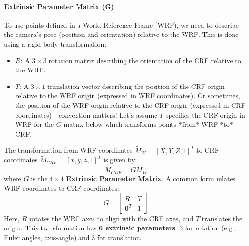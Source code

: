 \documentclass{article}
\begin{document}
\paragraph{Extrinsic Parameter Matrix (G)}
To use points defined in a World Reference Frame (WRF), we need to describe the camera's pose (position and orientation) relative to the WRF. This is done using a rigid body transformation:
\begin{itemize}
    \item $R$: A $3 \times 3$ rotation matrix describing the orientation of the CRF relative to the WRF.
    \item $T$: A $3 \times 1$ translation vector describing the position of the CRF origin relative to the WRF origin (expressed in WRF coordinates). Or sometimes, the position of the WRF origin relative to the CRF origin (expressed in CRF coordinates) - convention matters! Let's assume $T$ specifies the CRF origin in WRF for the $G$ matrix below which transforms points *from* WRF *to* CRF.
\end{itemize}
The transformation from WRF coordinates $\tilde{M}_W = [X, Y, Z, 1]^T$ to CRF coordinates $\tilde{M}_{CRF} = [x, y, z, 1]^T$ is given by:
\[
\tilde{M}_{CRF} = G \tilde{M}_W
\]
where $G$ is the $4 \times 4$ \textbf{Extrinsic Parameter Matrix}. A common form relates WRF coordinates to CRF coordinates:
\[
G = \begin{bmatrix} R & T \\ \mathbf{0}^T & 1 \end{bmatrix}
\]
Here, $R$ rotates the WRF axes to align with the CRF axes, and $T$ translates the origin. This transformation has \textbf{6 extrinsic parameters}: 3 for rotation (e.g., Euler angles, axis-angle) and 3 for translation.

\end{document}
